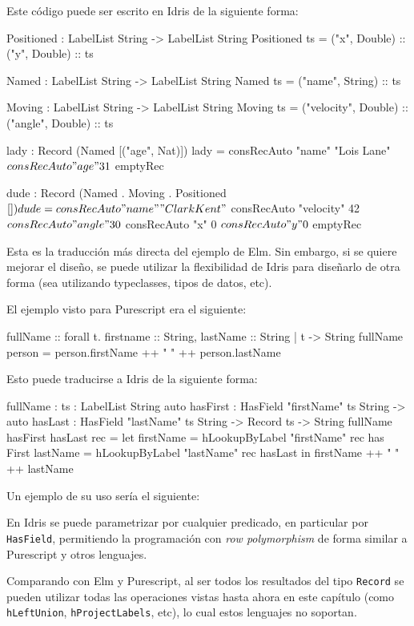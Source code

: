 Este código puede ser escrito en Idris de la siguiente forma:

\begin{code}
Positioned : LabelList String -> LabelList String
Positioned ts = ("x", Double) :: ("y", Double) :: ts

Named : LabelList String -> LabelList String
Named ts = ("name", String) :: ts

Moving : LabelList String -> LabelList String
Moving ts = ("velocity", Double) :: ("angle", Double) :: ts

lady : Record (Named [("age", Nat)])
lady = consRecAuto "name" "Lois Lane" $
  consRecAuto "age" 31 $
  emptyRec

dude : Record (Named . Moving . Positioned $ [])
dude = consRecAuto "name" "Clark Kent" $
  consRecAuto "velocity" 42 $
  consRecAuto "angle" 30 $
  consRecAuto "x" 0 $
  consRecAuto "y" 0 $
  emptyRec
\end{code}

Esta es la traducción más directa del ejemplo de Elm. Sin embargo, si se quiere mejorar el diseño, se puede utilizar la flexibilidad de Idris para diseñarlo de otra forma (sea utilizando typeclasses, tipos de datos, etc).

El ejemplo visto para Purescript era el siguiente:

\begin{code}
fullName :: forall t. { firstname :: String,
  lastName :: String | t } -> String
fullName person = person.firstName ++ " " ++ person.lastName
\end{code}

Esto puede traducirse a Idris de la siguiente forma:

\begin{code}
fullName : {ts : LabelList String}
  {auto hasFirst : HasField "firstName" ts String} ->
  {auto hasLast : HasField "lastName" ts String} ->
  Record ts -> String
fullName {hasFirst} {hasLast} rec =
  let firstName = hLookupByLabel "firstName" rec has First
    lastName = hLookupByLabel "lastName" rec hasLast
  in firstName ++ " " ++ lastName
\end{code}

Un ejemplo de su uso sería el siguiente:


En Idris se puede parametrizar por cualquier predicado, en particular por \texttt{HasField}, permitiendo la programación con \textit{row polymorphism} de forma similar a Purescript y otros lenguajes.

Comparando con Elm y Purescript, al ser todos los resultados del tipo \texttt{Record} se pueden utilizar todas las operaciones vistas hasta ahora en este capítulo (como \texttt{hLeftUnion}, \texttt{hProjectLabels}, etc), lo cual estos lenguajes no soportan.



